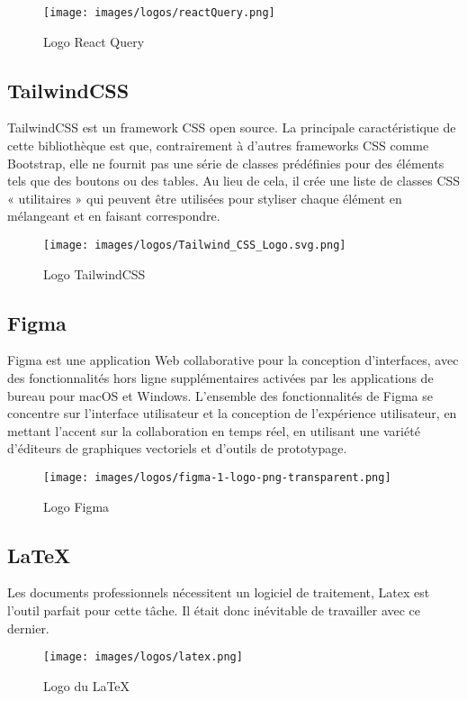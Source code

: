 \begin{figure}[!h]
\begin{center}
\texttt{[image: images/logos/reactQuery.png]}
\end{center}
\caption{Logo React Query }
\end{figure}

\subsection{TailwindCSS}
TailwindCSS est un framework CSS open source. La principale caractéristique de cette bibliothèque est que, contrairement à d’autres frameworks CSS comme Bootstrap, elle ne fournit pas une série de classes prédéfinies pour des éléments tels que des boutons ou des tables. Au lieu de cela, il crée une liste de classes CSS « utilitaires » qui peuvent être utilisées pour styliser chaque élément en mélangeant et en faisant correspondre. \cite{tailwindCSS}

\begin{figure}[!h]
\begin{center}
\texttt{[image: images/logos/Tailwind\_CSS\_Logo.svg.png]}
\end{center}
\caption{Logo TailwindCSS }
\end{figure}


\subsection{Figma}
Figma est une application Web collaborative pour la conception d’interfaces, avec des fonctionnalités hors ligne supplémentaires activées par les applications de bureau pour macOS et Windows. L’ensemble des fonctionnalités de Figma se concentre sur l’interface utilisateur et la conception de l’expérience utilisateur, en mettant l’accent sur la collaboration en temps réel, en utilisant une variété d’éditeurs de graphiques vectoriels et d’outils de prototypage. \cite{figma}

\begin{figure}[!h]
\begin{center}
\texttt{[image: images/logos/figma-1-logo-png-transparent.png]}
\end{center}
\caption{Logo Figma }
\end{figure}


\subsection{LaTeX}
Les documents professionnels nécessitent un logiciel de traitement, Latex est l'outil parfait pour cette tâche. Il était donc inévitable de travailler avec ce dernier.\\
\begin{figure}[!h]  
\begin{center}
\texttt{[image: images/logos/latex.png]}
\end{center}
\caption{Logo du LaTeX }
\end{figure}

